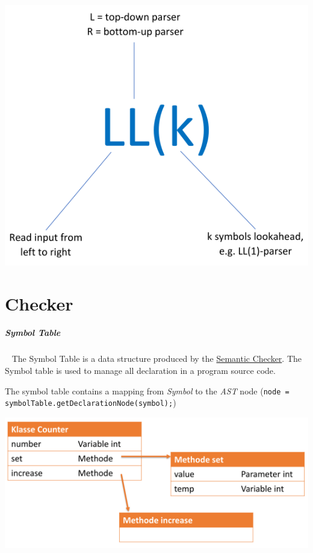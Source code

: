 \documentclass[12pt,twoside,landscape]{extarticle}
\begin{document}
\begin{multicols}{4}
{
\begin{center}
\includegraphics[width=.9\linewidth]{img/parser_notation.png}
\end{center}
\label{fig:parser-notation}
}

\section{Checker}
\label{sec:org1443101}
\subparagraph{Symbol Table} \
\label{sec:orgfa8c6a8}
The Symbol Table is a data structure produced by the \href{../../../roam/20221228115353-what_is_a_semantic_checker.org}{Semantic Checker}.
The Symbol table is used to manage all declaration in a program source code.

The symbol table contains a mapping from \emph{Symbol} to the \emph{AST} node (\texttt{node = symbolTable.getDeclarationNode(symbol);})


{
\begin{center}
\includegraphics[width=.9\linewidth]{img/symbol_table_example.png}
\end{center}
\label{fig:example-structure-for-a-symbol-table}
}

\end{multicols}
\end{document}
